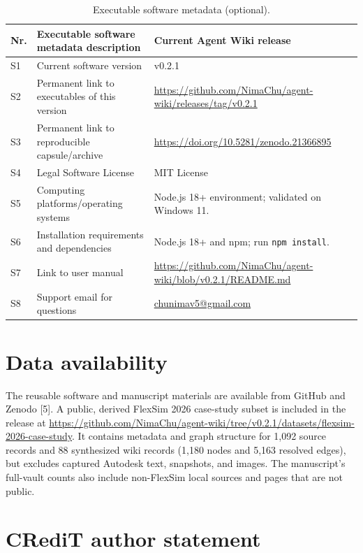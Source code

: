 \documentclass[preprint,12pt,a4paper]{elsarticle}
\begin{document}
\begin{table}[!h]
\small
\begin{tabular}{|p{0.7cm}|p{5.1cm}|p{7.2cm}|}
\hline
\textbf{Nr.} & \textbf{Executable software metadata description} & \textbf{Current Agent Wiki release} \\
\hline
S1 & Current software version & v0.2.1 \\
\hline
S2 & Permanent link to executables of this version &
\url{https://github.com/NimaChu/agent-wiki/releases/tag/v0.2.1} \\
\hline
S3 & Permanent link to reproducible capsule/archive &
\url{https://doi.org/10.5281/zenodo.21366895} \\
\hline
S4 & Legal Software License & MIT License \\
\hline
S5 & Computing platforms/operating systems &
Node.js 18+ environment; validated on Windows 11. \\
\hline
S6 & Installation requirements and dependencies & Node.js 18+ and npm; run \texttt{npm install}. \\
\hline
S7 & Link to user manual &
\url{https://github.com/NimaChu/agent-wiki/blob/v0.2.1/README.md} \\
\hline
S8 & Support email for questions & \href{mailto:chunimav5@gmail.com}{chunimav5@gmail.com} \\
\hline
\end{tabular}
\caption{Executable software metadata (optional).}
\label{tab:software-metadata}
\end{table}

\section*{Data availability}

The reusable software and manuscript materials are available from GitHub and
Zenodo [5]. A public, derived FlexSim 2026 case-study subset is included in the
release at \url{https://github.com/NimaChu/agent-wiki/tree/v0.2.1/datasets/flexsim-2026-case-study}.
It contains metadata and graph structure for 1,092 source records and 88
synthesized wiki records (1,180 nodes and 5,163 resolved edges), but excludes
captured Autodesk text, snapshots, and images. The manuscript's full-vault
counts also include non-FlexSim local sources and pages that are not public.

\section*{CRediT author statement}
\end{document}
